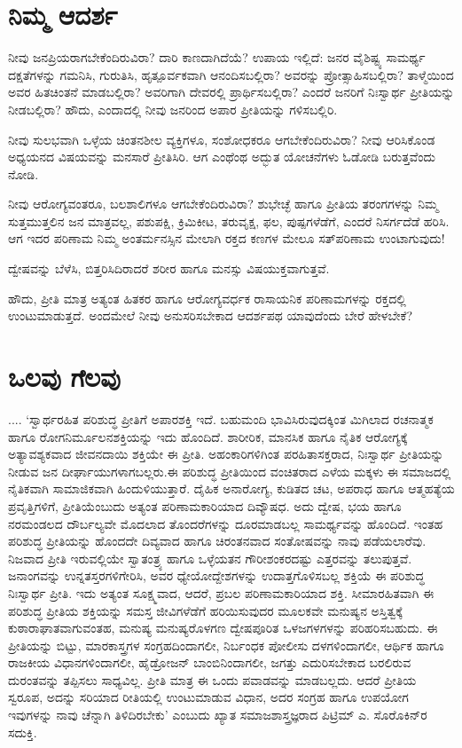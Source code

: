 \section*{ನಿಮ್ಮ ಆದರ್ಶ}


ನೀವು ಜನಪ್ರಿಯರಾಗಬೇಕೆಂದಿರುವಿರಾ? ದಾರಿ ಕಾಣದಾಗಿದೆಯೆ? ಉಪಾಯ ಇಲ್ಲಿದೆ: ಜನರ ವೈಶಿಷ್ಟ್ಯ ಸಾಮರ್ಥ್ಯ ದಕ್ಷತೆಗಳನ್ನು ಗಮನಿಸಿ, ಗುರುತಿಸಿ, ಹೃತ್ಪೂರ್ವಕವಾಗಿ ಆನಂದಿಸಬಲ್ಲಿರಾ? ಅವರನ್ನು ಪ್ರೋತ್ಸಾಹಿಸಬಲ್ಲಿರಾ? ತಾಳ್ಮೆಯಿಂದ ಅವರ ಹಿತಚಿಂತನೆ ಮಾಡಬಲ್ಲಿರಾ? ಅವರಿಗಾಗಿ ದೇವರಲ್ಲಿ ಪ್ರಾರ್ಥಿಸಬಲ್ಲಿರಾ? ಎಂದರೆ ಜನರಿಗೆ ನಿಃಸ್ವಾರ್ಥ ಪ್ರೀತಿಯನ್ನು ನೀಡಬಲ್ಲಿರಾ? ಹೌದು, ಎಂದಾದಲ್ಲಿ ನೀವು ಜನರಿಂದ ಅಪಾರ ಪ್ರೀತಿಯನ್ನು ಗಳಿಸಬಲ್ಲಿರಿ.

ನೀವು ಸುಲಭವಾಗಿ ಒಳ್ಳೆಯ ಚಿಂತನಶೀಲ ವ್ಯಕ್ತಿಗಳೂ, ಸಂಶೋಧಕರೂ ಆಗಬೇಕೆಂದಿರು\-ವಿರಾ? ನೀವು ಆರಿಸಿಕೊಂಡ ಅಧ್ಯಯನದ ವಿಷಯವನ್ನು ಮನಸಾರೆ ಪ್ರೀತಿಸಿರಿ. ಆಗ ಎಂಥೆಂಥ ಅದ್ಭುತ ಯೋಚನೆಗಳು ಓಡೋಡಿ ಬರುತ್ತವೆಂದು ನೋಡಿ.

ನೀವು ಆರೋಗ್ಯವಂತರೂ, ಬಲಶಾಲಿಗಳೂ ಆಗಬೇಕೆಂದಿರುವಿರಾ? ಶುಭೇಚ್ಛೆ ಹಾಗೂ ಪ್ರೀತಿಯ ತರಂಗಗಳನ್ನು ನಿಮ್ಮ ಸುತ್ತಮುತ್ತಲಿನ ಜನ ಮಾತ್ರವಲ್ಲ, ಪಶುಪಕ್ಷಿ, ಕ್ರಿಮಿಕೀಟ, ತರುವೃಕ್ಷ, ಫಲ, ಪುಷ್ಪಗಳೆಡೆಗೆ, ಎಂದರೆ ನಿಸರ್ಗದೆಡೆ ಹರಿಸಿ. ಆಗ ಇದರ ಪರಿಣಾಮ ನಿಮ್ಮ ಅಂತರ್ಮನಸ್ಸಿನ ಮೇಲಾಗಿ ರಕ್ತದ ಕಣಗಳ ಮೇಲೂ ಸತ್​ಪರಿಣಾಮ ಉಂಟಾಗುವುದು!

ದ್ವೇಷವನ್ನು ಬೆಳೆಸಿ, ಬಿತ್ತರಿಸಿದಿರಾದರೆ ಶರೀರ ಹಾಗೂ ಮನಸ್ಸು ವಿಷಯುಕ್ತವಾಗುತ್ತವೆ.

ಹೌದು, ಪ್ರೀತಿ ಮಾತ್ರ ಅತ್ಯಂತ ಹಿತಕರ ಹಾಗೂ ಆರೋಗ್ಯವರ್ಧಕ ರಾಸಾಯನಿಕ ಪರಿಣಾಮಗಳನ್ನು ರಕ್ತದಲ್ಲಿ ಉಂಟುಮಾಡುತ್ತದೆ. ಅಂದಮೇಲೆ ನೀವು ಅನುಸರಿಸಬೇಕಾದ ಆದರ್ಶಪಥ ಯಾವುದೆಂದು ಬೇರೆ ಹೇಳಬೇಕೆ?


\section*{ಒಲವು ಗೆಲವು}


.... ‘ಸ್ವಾರ್ಥರಹಿತ ಪರಿಶುದ್ಧ ಪ್ರೀತಿಗೆ ಅಪಾರಶಕ್ತಿ ಇದೆ. ಬಹುಮಂದಿ ಭಾವಿಸಿರುವು\-ದಕ್ಕಿಂತ ಮಿಗಿಲಾದ ರಚನಾತ್ಮಕ ಹಾಗೂ ರೋಗನಿರ್ಮೂಲನಶಕ್ತಿಯನ್ನು ಇದು ಹೊಂದಿದೆ. ಶಾರೀರಿಕ, ಮಾನಸಿಕ ಹಾಗೂ ನೈತಿಕ ಆರೋಗ್ಯಕ್ಕೆ ಅತ್ಯಾವಶ್ಯಕವಾದ ಜೀವನದಾಯಿ ಶಕ್ತಿಯೇ ಈ ಪ್ರೀತಿ. ಅಹಂಕಾರಿಗಳಿಗಿಂತ ಪರಹಿತಾಸಕ್ತರಾದ, ನಿಃಸ್ವಾರ್ಥ ಪ್ರೀತಿಯನ್ನು ನೀಡುವ ಜನ ದೀರ್ಘಾಯುಗಳಾಗಬಲ್ಲರು.ಈ ಪರಿಶುದ್ಧ ಪ್ರೀತಿಯಿಂದ ವಂಚಿತರಾದ ಎಳೆಯ ಮಕ್ಕಳು ಈ ಸಮಾಜದಲ್ಲಿ ನೈತಿಕವಾಗಿ ಸಾಮಾಜಿಕವಾಗಿ ಹಿಂದುಳಿಯುತ್ತಾರೆ. ದೈಹಿಕ ಅನಾರೋಗ್ಯ, ಕುಡಿತದ ಚಟ, ಅಪರಾಧ ಹಾಗೂ ಆತ್ಮಹತ್ಯೆಯ ಪ್ರವೃತ್ತಿಗಳಿಗೆ, ಪ್ರೀತಿಯೆಂಬುದು ಅತ್ಯಂತ ಪರಿಣಾಮಕಾರಿಯಾದ ದಿವ್ಯೌಷಧ. ಅದು ದ್ವೇಷ, ಭಯ ಹಾಗೂ ನರಮಂಡಲದ ದೌರ್ಬಲ್ಯವೇ ಮೊದಲಾದ ತೊಂದರೆಗಳನ್ನು ದೂರಮಾಡಬಲ್ಲ ಸಾಮರ್ಥ್ಯವನ್ನು ಹೊಂದಿದೆ. ಇಂತಹ ಪರಿಶುದ್ಧ ಪ್ರೀತಿಯನ್ನು ಹೊಂದದೇ ದಿವ್ಯವಾದ ಹಾಗೂ ಚಿರಂತನವಾದ ಸಂತೋಷವನ್ನು ನಾವು ಪಡೆಯಲಾರೆವು. ನಿಜವಾದ ಪ್ರೀತಿ ಇರುವಲ್ಲಿಯೇ ಸ್ವಾತಂತ್ರ್ಯ ಹಾಗೂ ಒಳ್ಳೆಯತನ ಗೌರೀಶಂಕರದಷ್ಟು ಎತ್ತರವನ್ನು ತಲುಪುತ್ತವೆ. ಜನಾಂಗವನ್ನು ಉನ್ನತಸ್ತರಗಳಿಗೇರಿಸಿ, ಅವರ ಧ್ಯೇಯೋದ್ದೇಶಗಳನ್ನು ಉದಾತ್ತಗೊಳಿಸಬಲ್ಲ ಶಕ್ತಿಯೆ ಈ ಪರಿಶುದ್ಧ ನಿಃಸ್ವಾರ್ಥ ಪ್ರೀತಿ. ಇದು ಅತ್ಯಂತ ಸೂಕ್ಷ್ಮವಾದ, ಆದರೆ, ಪ್ರಬಲ ಪರಿಣಾಮಕಾರಿಯಾದ ಶಕ್ತಿ. ಸೀಮಾರಹಿತವಾಗಿ ಈ ಪರಿಶುದ್ಧ ಪ್ರೀತಿಯ ಶಕ್ತಿಯನ್ನು ಸಮಸ್ತ ಜೀವಿಗಳೆಡೆಗೆ ಹರಿಯಿಸುವುದರ ಮೂಲಕವೇ ಮನುಷ್ಯನ ಅಸ್ತಿತ್ವಕ್ಕೆ ಕುಠಾರಾಘಾತ\-ವಾಗುವಂತಹ, ಮನುಷ್ಯ ಮನುಷ್ಯರೊಳಗಣ ದ್ವೇಷಪೂರಿತ ಒಳಜಗಳಗಳನ್ನು ಪರಿಹರಿಸಬಹುದು. ಈ ಪ್ರೀತಿಯನ್ನು ಬಿಟ್ಟು, ಮಾರಕಾಸ್ತ್ರಗಳ ಸಂಗ್ರಹದಿಂದಾಗಲೀ, ನಿರ್ಬಂಧಕ ಪೋಲೀಸು ದಳ\-ಗಳಿಂ\-ದಾಗಲೀ, ಆರ್ಥಿಕ ಹಾಗೂ ರಾಜಕೀಯ ವಿಧಾನಗಳಿಂದಾಗಲೀ, ಹೈಡ್ರೋಜನ್ ಬಾಂಬಿ\-ನಿಂದಾ\-ಗಲೀ, ಜಗತ್ತು ಎದುರಿಸಬೇಕಾದ ಬರಲಿರುವ ದುರಂತವನ್ನು ತಪ್ಪಿಸಲು ಸಾಧ್ಯವಿಲ್ಲ. ಪ್ರೀತಿ ಮಾತ್ರ ಈ ಒಂದು ಪವಾಡವನ್ನು ಮಾಡಬಲ್ಲದು. ಆದರೆ ಪ್ರೀತಿಯ ಸ್ವರೂಪ, ಅದನ್ನು ಸರಿಯಾದ ರೀತಿಯಲ್ಲಿ ಉಂಟುಮಾಡುವ ವಿಧಾನ, ಅದರ ಸಂಗ್ರಹ ಹಾಗೂ ಉಪಯೋಗ ಇವುಗಳನ್ನು ನಾವು ಚೆನ್ನಾಗಿ ತಿಳಿದಿರಬೇಕು’ ಎಂಬುದು ಖ್ಯಾತ ಸಮಾಜಶಾಸ್ತ್ರಜ್ಞರಾದ ಪಿಟ್ರಿಮ್ ಎ. ಸೊರೊಕಿನ್​ರ ಸದುಕ್ತಿ.

